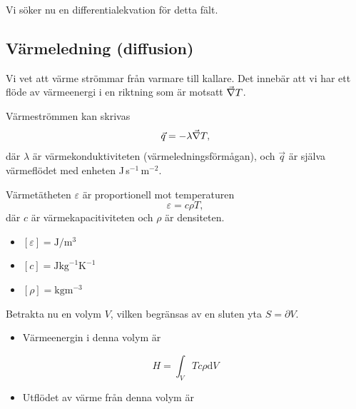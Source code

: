 \documentclass[%
oneside,                 %
final,                   %
10pt]{article}
\newenvironment{summary_mdfboxadmon}[1][]{
\begin{summary_mdfboxmdframed}[frametitle=#1]
}
{
\end{summary_mdfboxmdframed}
}
\begin{document}
\noindent
Vi söker nu en differentialekvation för detta fält.

\subsection*{Värmeledning (diffusion)}

Vi vet att värme strömmar från varmare till kallare.  Det innebär att
vi har ett flöde av värmeenergi i en riktning som är motsatt $\vec{\nabla} T$.


\begin{summary_mdfboxadmon}[Antagande 1]
Värmeströmmen kan skrivas
\begin{equation}
  \vec{q} = -\lambda\vec{\nabla} T,
\end{equation}
där $\lambda$ är värmekonduktiviteten (värmeledningsförmågan), och $\vec{q}$ är själva 
värmeflödet med enheten J\,s$^{-1}$\,m$^{-2}$.
\end{summary_mdfboxadmon} %




\begin{summary_mdfboxadmon}[Antagande 2]
Värmetätheten $\varepsilon$ är proportionell mot temperaturen
$$
\varepsilon = c \rho T,
$$
där $c$ är värmekapacitiviteten och $\rho$ är densiteten.
\begin{itemize}
\item $[\varepsilon] = \mathrm{J}/\mathrm{m}^3$

\item $[c] = \mathrm{J} \mathrm{kg}^{-1} \mathrm{K}^{-1}$

\item $[\rho] = \mathrm{kg} \mathrm{m}^{-3}$
\end{itemize}

\noindent
\end{summary_mdfboxadmon} %



Betrakta nu en volym $V$, vilken begränsas av en sluten yta $S = \partial V$.  
\begin{itemize}
\item Värmeenergin i denna volym är
\end{itemize}

\noindent
\begin{equation}
  H = \int_{V} Tc\rho \mbox{d}V
  \label{eq:H}
\end{equation}
\begin{itemize}
\item Utflödet av värme från denna volym är 
\end{itemize}
\end{document}
